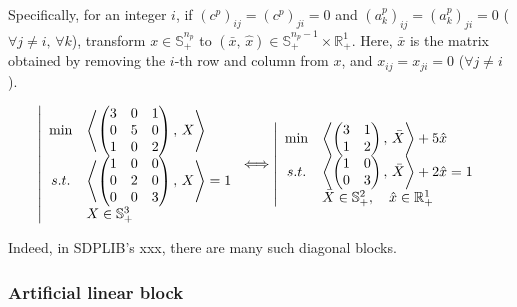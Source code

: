 Specifically, for an integer $i$,
if $(c^p)_{ij}=(c^p)_{ji}=0$ and $(a^p_k)_{ij}=(a^p_k)_{ji}=0$ 
($\forall j\neq i,\,\forall k$),
transform $x\in \mathbb{S}^{n_p}_+$ to $(\bar{x},\,\hat{x})\in \mathbb{S}^{n_p-1}_+\times \mathbb{R}^1_+$.
Here, $\bar{x}$ is the matrix obtained by removing the $i$-th row and column from $x$, and $x_{ij}= x_{ji}=0$ ($\forall j\neq i$).

\begin{example}
\begin{equation*}
    \left|
    \begin{array}{cl}
        \min & \left\langle \begin{pmatrix}
            3 & 0 & 1 \\
            0 & 5 & 0 \\
            1 & 0 & 2
        \end{pmatrix}, \, X \right\rangle \\
        s.t. 
        & \left\langle \begin{pmatrix}
            1 & 0 & 0 \\ 
            0 & 2 & 0 \\ 
            0 & 0 & 3
        \end{pmatrix}, \, X \right\rangle = 1 \\
        & X\in \mathbb{S}^3_+ 
    \end{array}
    \right.
    \Longleftrightarrow
    \left|
    \begin{array}{cl}
        \min & \left\langle \begin{pmatrix}
            3 & 1 \\
            1 & 2
        \end{pmatrix}, \, \bar{X} \right\rangle + 5\hat{x} \\
        s.t. 
        & \left\langle \begin{pmatrix}
            1 & 0 \\ 0 & 3
        \end{pmatrix}, \, \bar{X} \right\rangle + 2\hat{x} = 1 \\
        & \bar{X}\in \mathbb{S}^2_+, \quad \hat{x} \in \mathbb{R}^1_+
    \end{array}
    \right.
\end{equation*}
\end{example}
Indeed, in SDPLIB's xxx, there are many such diagonal blocks.

\subsubsection{Artificial linear block}

